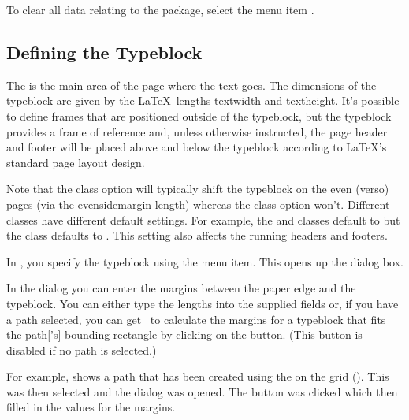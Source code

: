 
To clear all data relating to the  package,
select the menu item .


\subsection{Defining the Typeblock}\label{sec:typeblock}

The  is the main area of the page where the text goes.
The dimensions of the \gls{typeblock} are given by the \LaTeX\ lengths
\gls{textwidth} and \gls{textheight}. It's possible to
define frames that are positioned outside of the \gls{typeblock}, but the
\gls{typeblock} provides a frame of reference and, unless otherwise
instructed, the page header and footer will be placed above and
below the \gls{typeblock} according to \LaTeX's standard page layout
design.

Note that the  class option will typically
shift the typeblock on the even (\gls{verso}) pages (via the
\gls{evensidemargin} length) whereas the
 class option won't. Different classes have
different default settings. For example, the  and
 classes default to  but the
 class defaults to . This setting also
affects the running headers and footers.


In \FlowframTk, you specify the \gls{typeblock} using the
 menu item.  This
opens up the  dialog box.


In the  dialog you can enter the margins
between the paper edge and the \gls{typeblock}. You can either type the
lengths into the supplied fields or, if you have a \gls{path}
selected, you can get \FlowframTk\ to calculate the margins for a
\gls{typeblock} that fits the \gls{path}['s] bounding rectangle by
clicking on the  button.
(This button is disabled if no \gls*{path} is selected.)

For example,  shows a \gls*{path} that
has been created using the  on the
 grid (). This was then selected and the
 dialog was opened. The
 button was clicked
which then filled in the values for the margins.

